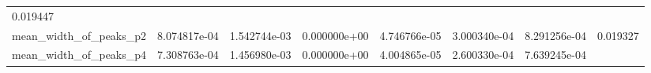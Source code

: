 \documentclass[11pt]{article}
\begin{document}
\begin{longtable}[]{@{}llllllll@{}}
\begin{minipage}[t]{0.08\columnwidth}
0.019447\strut
\end{minipage}\tabularnewline
\begin{minipage}[t]{0.16\columnwidth}\raggedright
mean\_width\_of\_peaks\_p2\strut
\end{minipage} & \begin{minipage}[t]{0.09\columnwidth}\raggedright
8.074817e-04\strut
\end{minipage} & \begin{minipage}[t]{0.09\columnwidth}\raggedright
1.542744e-03\strut
\end{minipage} & \begin{minipage}[t]{0.09\columnwidth}\raggedright
0.000000e+00\strut
\end{minipage} & \begin{minipage}[t]{0.09\columnwidth}\raggedright
4.746766e-05\strut
\end{minipage} & \begin{minipage}[t]{0.09\columnwidth}\raggedright
3.000340e-04\strut
\end{minipage} & \begin{minipage}[t]{0.09\columnwidth}\raggedright
8.291256e-04\strut
\end{minipage} & \begin{minipage}[t]{0.08\columnwidth}\raggedright
0.019327\strut
\end{minipage}\tabularnewline
\begin{minipage}[t]{0.16\columnwidth}\raggedright
mean\_width\_of\_peaks\_p4\strut
\end{minipage} & \begin{minipage}[t]{0.09\columnwidth}\raggedright
7.308763e-04\strut
\end{minipage} & \begin{minipage}[t]{0.09\columnwidth}\raggedright
1.456980e-03\strut
\end{minipage} & \begin{minipage}[t]{0.09\columnwidth}\raggedright
0.000000e+00\strut
\end{minipage} & \begin{minipage}[t]{0.09\columnwidth}\raggedright
4.004865e-05\strut
\end{minipage} & \begin{minipage}[t]{0.09\columnwidth}\raggedright
2.600330e-04\strut
\end{minipage} & \begin{minipage}[t]{0.09\columnwidth}\raggedright
7.639245e-04\strut
\end{minipage} & \begin{minipage}[t]{0.08\columnwidth}\raggedright

\end{minipage}
\end{longtable}
\end{document}
